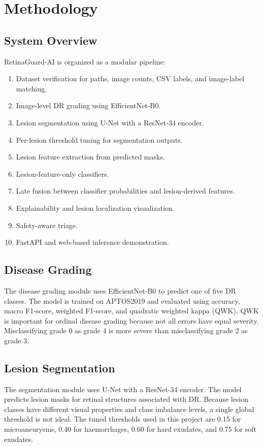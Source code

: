 \documentclass[conference]{IEEEtran}
\begin{document}
\section{Methodology}
\subsection{System Overview}
RetinaGuard-AI is organized as a modular pipeline:
\begin{enumerate}
    \item Dataset verification for paths, image counts, CSV labels, and image-label matching.
    \item Image-level DR grading using EfficientNet-B0.
    \item Lesion segmentation using U-Net with a ResNet-34 encoder.
    \item Per-lesion threshold tuning for segmentation outputs.
    \item Lesion feature extraction from predicted masks.
    \item Lesion-feature-only classifiers.
    \item Late fusion between classifier probabilities and lesion-derived features.
    \item Explainability and lesion localization visualization.
    \item Safety-aware triage.
    \item FastAPI and web-based inference demonstration.
\end{enumerate}

\subsection{Disease Grading}
The disease grading module uses EfficientNet-B0 to predict one of five DR classes. The model is trained on APTOS2019 and evaluated using accuracy, macro F1-score, weighted F1-score, and quadratic weighted kappa (QWK). QWK is important for ordinal disease grading because not all errors have equal severity. Misclassifying grade 0 as grade 4 is more severe than misclassifying grade 2 as grade 3.

\subsection{Lesion Segmentation}
The segmentation module uses U-Net with a ResNet-34 encoder. The model predicts lesion masks for retinal structures associated with DR. Because lesion classes have different visual properties and class imbalance levels, a single global threshold is not ideal. The tuned thresholds used in this project are 0.15 for microaneurysms, 0.40 for haemorrhages, 0.60 for hard exudates, and 0.75 for soft exudates.
\end{document}
